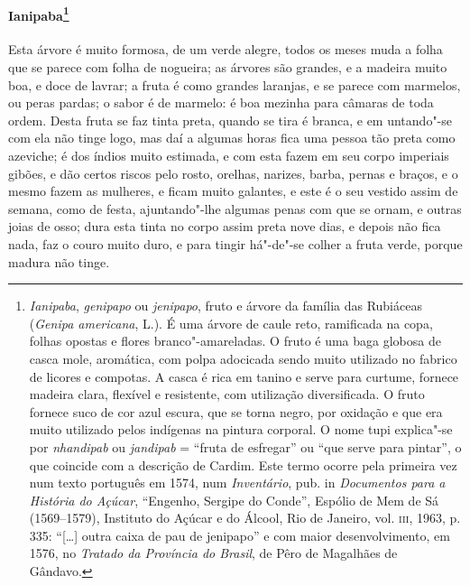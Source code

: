 \paragraph{Ianipaba\footnote{ \textit{Ianipaba}, \textit{genipapo} ou
\textit{jenipapo}, fruto e árvore da família das Rubiáceas (\textit{Genipa americana}, L.). 
É uma árvore de caule reto, ramificada
na copa, folhas opostas e flores branco"-amareladas. O fruto é uma baga
globosa de casca mole, aromática, com polpa adocicada sendo muito
utilizado no fabrico de licores e compotas. A casca é rica em tanino e
serve para curtume, fornece madeira clara, flexível e resistente, com
utilização diversificada. O fruto fornece suco de cor azul escura, que
se torna negro, por oxidação e que era muito utilizado pelos indígenas
na pintura corporal. O nome tupi explica"-se por \textit{nhandipab} ou
\textit{jandipab} = ``fruta de esfregar'' ou ``que serve para pintar'', o
que coincide com a descrição de Cardim. Este termo ocorre pela primeira
vez num texto português em 1574, num \textit{Inventário}, pub. in
\textit{Documentos para a História do Açúcar}, ``Engenho, Sergipe do
Conde'', Espólio de Mem de Sá (1569--1579), Instituto do Açúcar e do
Álcool, Rio de Janeiro, vol. \textsc{iii}, 1963, p. 335: ``[\ldots{}] outra caixa de
pau de jenipapo'' e com maior desenvolvimento, em 1576, no
\textit{Tratado da Província do Brasil}, de Pêro de Magalhães de Gândavo.}} 
Esta árvore é muito formosa, de um verde alegre,
todos os meses muda a folha que se parece com folha de nogueira; as
árvores são grandes, e a madeira muito boa, e doce de lavrar; a fruta é
como grandes laranjas, e se parece com marmelos, ou peras pardas; o
sabor é de marmelo: é boa mezinha para câmaras de toda ordem. Desta
fruta se faz tinta preta, quando se tira é branca, e em untando"-se com
ela não tinge logo, mas daí a algumas horas fica uma pessoa tão preta
como azeviche; é dos índios muito estimada, e com esta fazem em seu
corpo imperiais gibões, e dão certos riscos pelo rosto, orelhas,
narizes, barba, pernas e braços, e o mesmo fazem as mulheres, e ficam
muito galantes, e este é o seu vestido assim de semana, como de festa,
ajuntando"-lhe algumas penas com que se ornam, e outras joias de osso;
dura esta tinta no corpo assim preta nove dias, e depois não fica nada,
faz o couro muito duro, e para tingir há"-de"-se colher a fruta verde,
porque madura não tinge.

